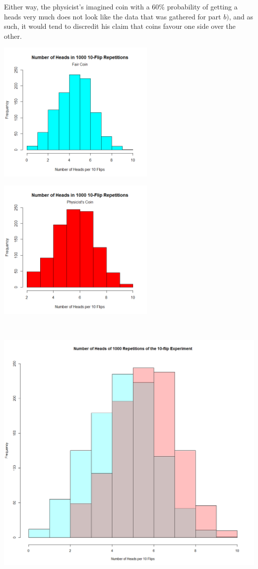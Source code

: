 \documentclass{article}
\begin{document}
\begin{enumerate}[\quad(a)]
	Either way, the physicist's imagined coin with a 60\% probability of getting a heads very much does not look like the data that was gathered for part $b)$, and as such, it would tend to discredit his claim that coins favour one side over the other.
	\newpage
	\begin{minipage}{0.46\textwidth}
		\includegraphics[width=3in]{q61.png}
	\end{minipage}
	\begin{minipage}{0.4\textwidth}
		\includegraphics[width=3in]{q62.png}
	\end{minipage}\\
	\begin{minipage}{0.8\textwidth}
		\includegraphics[width=5.5in]{q63.png}
	\end{minipage}
\end{enumerate}
\newpage
\end{document}
